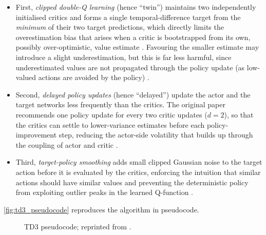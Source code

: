 \begin{itemize}
  \item First, \emph{clipped double-Q learning} (hence ``twin'') maintains two independently initialised critics and forms a single temporal-difference target from the \emph{minimum} of their two target predictions, which directly limits the overestimation bias that arises when a critic is bootstrapped from its own, possibly over-optimistic, value estimate \cite{openai_twin_nodate, fujimoto_addressing_2018}. Favouring the smaller estimate may introduce a slight underestimation, but this is far less harmful, since underestimated values are not propagated through the policy update (as low-valued actions are avoided by the policy) \cite{fujimoto_addressing_2018}.
  \item Second, \emph{delayed policy updates} (hence ``delayed'') update the actor and the target networks less frequently than the critics. The original paper recommends one policy update for every two critic updates ($d = 2$), so that the critics can settle to lower-variance estimates before each policy-improvement step, reducing the actor-side volatility that builds up through the coupling of actor and critic \cite{openai_twin_nodate, fujimoto_addressing_2018}.
  \item Third, \emph{target-policy smoothing} adds small clipped Gaussian noise to the target action before it is evaluated by the critics, enforcing the intuition that similar actions should have similar values and preventing the deterministic policy from exploiting outlier peaks in the learned Q-function \cite{openai_twin_nodate, fujimoto_addressing_2018}.
\end{itemize}

\autoref{fig:td3_pseudocode} reproduces the algorithm in pseudocode.

\begin{figure}[htbp]
  \centering
  
  \caption[TD3 pseudocode]{TD3 pseudocode; reprinted from \cite{openai_twin_nodate}.}
  \label{fig:td3_pseudocode}
\end{figure}

